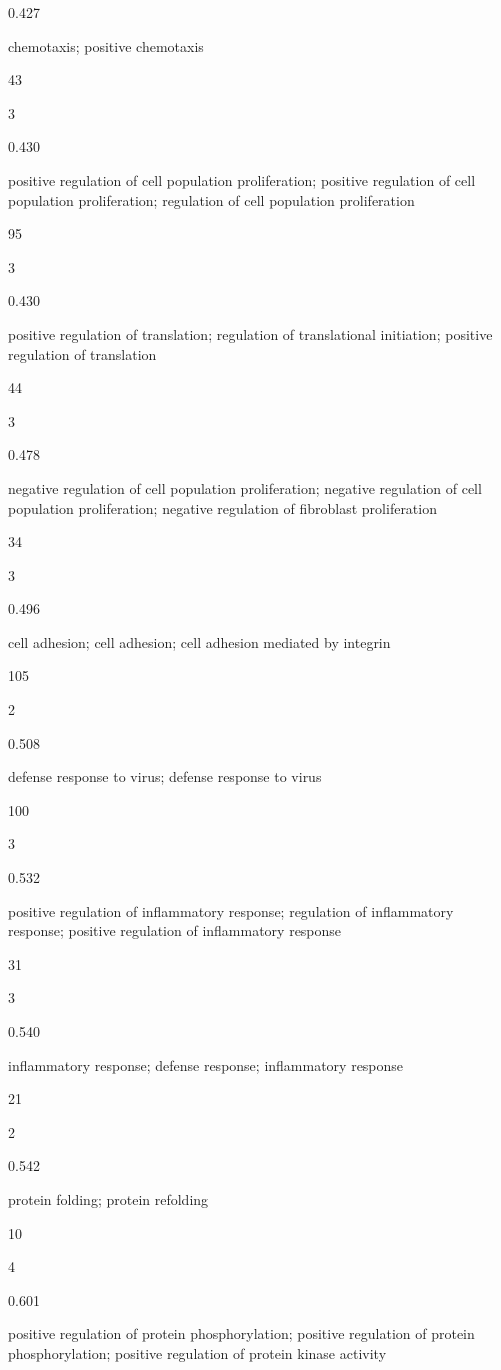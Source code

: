 \documentclass[
  letterpaper,
  DIV=11,
  numbers=noendperiod,
  openany,
  oneside]{scrreprt}
\begin{document}
0.427

chemotaxis; positive chemotaxis

43

3

0.430

positive regulation of cell population proliferation; positive
regulation of cell population proliferation; regulation of cell
population proliferation

95

3

0.430

positive regulation of translation; regulation of translational
initiation; positive regulation of translation

44

3

0.478

negative regulation of cell population proliferation; negative
regulation of cell population proliferation; negative regulation of
fibroblast proliferation

34

3

0.496

cell adhesion; cell adhesion; cell adhesion mediated by integrin

105

2

0.508

defense response to virus; defense response to virus

100

3

0.532

positive regulation of inflammatory response; regulation of inflammatory
response; positive regulation of inflammatory response

31

3

0.540

inflammatory response; defense response; inflammatory response

21

2

0.542

protein folding; protein refolding

10

4

0.601

positive regulation of protein phosphorylation; positive regulation of
protein phosphorylation; positive regulation of protein kinase activity
\end{document}
